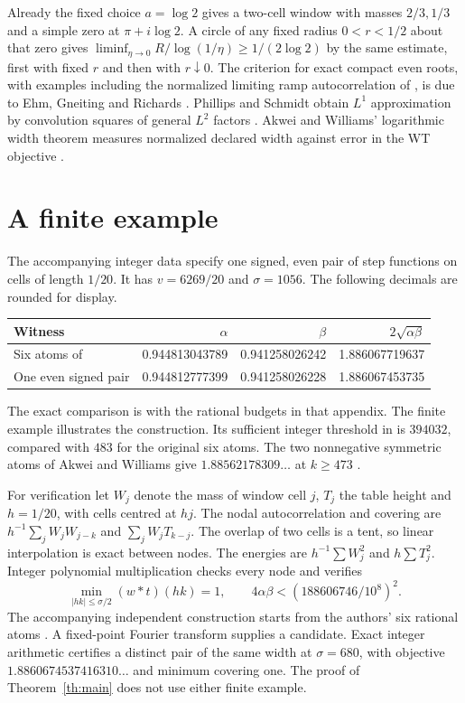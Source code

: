 \documentclass[11pt]{article}
\begin{document}
Already the fixed choice \(a=\log2\) gives a two-cell window with masses \(2/3,1/3\) and a simple zero at \(\pi+i\log2\). A circle of any fixed radius \(0<r<1/2\) about that zero gives \(\liminf_{\eta\to0}R/\log(1/\eta)\ge1/(2\log2)\) by the same estimate, first with fixed \(r\) and then with \(r\downarrow0\). The criterion for exact compact even roots, with examples including the normalized limiting ramp autocorrelation of \cite{aw}, is due to Ehm, Gneiting and Richards \cite[Theorem 2.1(d), Examples 2.3--2.4 and \S3.5]{egr}. Phillips and Schmidt obtain \(L^1\) approximation by convolution squares of general \(L^2\) factors \cite[Corollary 5]{ps}. Akwei and Williams' logarithmic width theorem measures normalized declared width against error in the WT objective \cite{aw}.

\section{A finite example}
The accompanying integer data specify one signed, even pair of step functions on cells of length \(1/20\). It has \(v=6269/20\) and \(\sigma=1056\). The following decimals are rounded for display.
\begin{center}
\small\begin{tabular}{lrrr}
\toprule
Witness & \(\alpha\) & \(\beta\) & \(2\sqrt{\alpha\beta}\)\\
\midrule
Six atoms of \cite[Appendix A.3]{cot} & 0.944813043789 & 0.941258026242 & 1.886067719637\\
One even signed pair & 0.944812777399 & 0.941258026228 & 1.886067453735\\
\bottomrule
\end{tabular}
\end{center}
The exact comparison is with the rational budgets in that appendix. The finite example illustrates the construction. Its sufficient integer threshold in \cite[Theorem 2.3]{cot} is \(394032\), compared with \(483\) for the original six atoms. The two nonnegative symmetric atoms of Akwei and Williams give \(1.88562178309\ldots\) at \(k\ge473\) \cite{aw}.

For verification let \(W_j\) denote the mass of window cell \(j\), \(T_j\) the table height and \(h=1/20\), with cells centred at \(hj\). The nodal autocorrelation and covering are \(h^{-1}\sum_j W_j W_{j-k}\) and \(\sum_j W_jT_{k-j}\). The overlap of two cells is a tent, so linear interpolation is exact between nodes. The energies are \(h^{-1}\sum W_j^2\) and \(h\sum T_j^2\). Integer polynomial multiplication checks every node and verifies
\[
 \min_{|hk|\le\sigma/2}(w*t)(hk)=1,\qquad
 4\alpha\beta<(188606746/10^8)^2 .
\]
The accompanying independent construction starts from the authors' six rational atoms \cite{data}. A fixed-point Fourier transform supplies a candidate. Exact integer arithmetic certifies a distinct pair of the same width at \(\sigma=680\), with objective \(1.8860674537416310\ldots\) and minimum covering one. The proof of Theorem~\ref{th:main} does not use either finite example.
\end{document}
